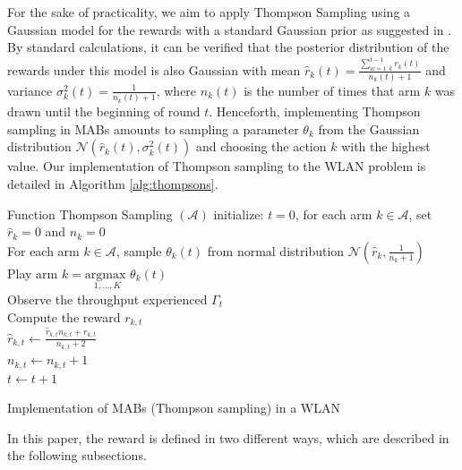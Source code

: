 \documentclass[preprint,12pt]{elsarticle}
\begin{document}
For the sake of practicality, we aim to apply Thompson Sampling using a Gaussian model for the rewards with a standard Gaussian prior as suggested in \cite{agrawal2013further}. By standard calculations, it can be verified that the posterior distribution of the rewards under this model is also Gaussian with mean $\hat{r}_k(t) = \frac{\sum_{w=1:k}^{t-1} r_k(t) }{n_k(t) + 1}$ and variance $\sigma_k^2(t) = \frac{1}{n_k(t) + 1}$, where $n_k(t)$ is the number of times that arm $k$ was drawn until the beginning of round $t$. Henceforth, implementing Thompson sampling in MABs amounts to sampling a parameter $\theta_k$ from the Gaussian distribution $\mathcal{N}\left(\hat{r}_k(t),\sigma_k^2(t)\right)$ and choosing the action $k$ with the highest value. Our implementation of Thompson sampling to the WLAN problem is detailed in Algorithm \ref{alg:thompsons}.	
\begin{algorithm}[h!]
	Function Thompson Sampling $(\mathcal{A})$\;
	initialize: $t=0$,  for each arm $k \in \mathcal{A}$, set $\hat{r}_{k} = 0$ and $n_k = 0$ \\
	{
		For each arm $k \in \mathcal{A}$, sample $\theta_k(t)$ from normal distribution $\mathcal{N}(\hat{r}_{k}, \frac{1}{n_k + 1})$ \\
		Play arm $k = \underset{1,...,K}{\text{argmax }} \theta_k(t) $ \\
		Observe the throughput experienced $\Gamma_t$\\			
		Compute the reward $r_{k,t}$ \\
		$ \hat{r}_{k,t} \leftarrow \frac{\hat{r}_{k,t}  n_{k,t} + r_{k,t}}{n_{k,t} + 2}$\\
		$n_{k,t} \leftarrow n_{k,t} + 1$\\
		$t \leftarrow t + 1$
	}
	\caption{Implementation of MABs (Thompson sampling) in a WLAN}
	\label{alg:thompsons}
\end{algorithm}	

In this paper, the reward is defined in two different ways, which are described in the following subsections.

\end{document}
